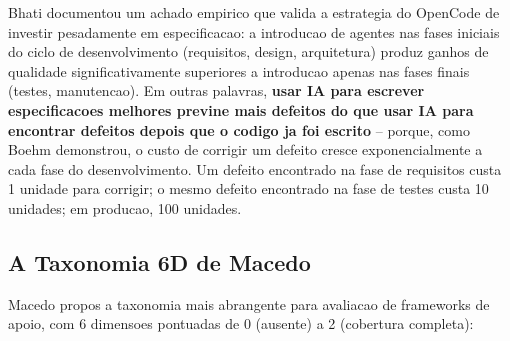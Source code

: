 \documentclass[12pt,a4paper,oneside,sumario=tradicional,chapter=TITLE,section=TITLE,subsection=TITLE,english,brazil]{abntex2}
\begin{document}
Bhati \cite{bhati2026agentic} documentou um achado empirico que valida a estrategia do OpenCode de investir pesadamente em especificacao: a introducao de agentes nas fases iniciais do ciclo de desenvolvimento (requisitos, design, arquitetura) produz ganhos de qualidade significativamente superiores a introducao apenas nas fases finais (testes, manutencao). Em outras palavras, \textbf{usar IA para escrever especificacoes melhores previne mais defeitos do que usar IA para encontrar defeitos depois que o codigo ja foi escrito} -- porque, como Boehm \cite{boehm1981software} demonstrou, o custo de corrigir um defeito cresce exponencialmente a cada fase do desenvolvimento. Um defeito encontrado na fase de requisitos custa 1 unidade para corrigir; o mesmo defeito encontrado na fase de testes custa 10 unidades; em producao, 100 unidades.

\subsection{A Taxonomia 6D de Macedo}

Macedo \cite{macedo2026fromprompt} propos a taxonomia mais abrangente para avaliacao de frameworks de apoio, com 6 dimensoes pontuadas de 0 (ausente) a 2 (cobertura completa):
\end{document}
